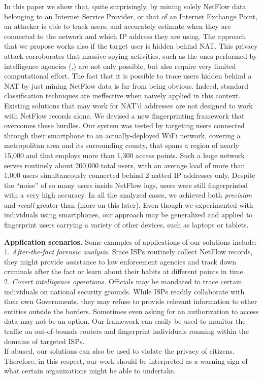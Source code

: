 \documentclass[10pt,conference,compsocconf,letterpaper]{IEEEtran}
\begin{document}
In this paper we show that, quite surprisingly, by mining solely NetFlow data belonging to an Internet Service Provider, or that of an Internet Exchange Point, an attacker is able to track users, and accurately estimate when they are connected to the network and which IP address they are using.  The approach that we propose works also if the target user is hidden behind NAT. This privacy attack corroborates that massive spying activities, such as the ones performed by intelligence agencies (\cite{Brandom2013},\cite{Ehrenfreund2013}) are not only possible, but also require very limited computational effort. 
The fact that it is possible to trace users hidden behind a NAT by just mining NetFlow data is far from being obvious. Indeed, standard classification techniques are ineffective when naively applied in this context. Existing solutions that may work for NAT'd addresses are not designed to work with NetFlow records alone. We devised a new fingerprinting framework that overcomes these hurdles. Our system was tested by targeting users connected through their smartphone to an actually-deployed WiFi network, covering a metropolitan area and its surrounding county, that spans a region of nearly 15,000  and that employs more than 1,300 access points. Such a huge network serves routinely about 200,000 total users, with an average load of more than 1,000 users simultaneously connected behind 2 natted IP addresses only. Despite the ``noise'' of so many users inside NetFlow logs,  users were still fingerprinted with a very high accuracy. In all the analyzed cases, we achieved both {\em precision} and {\em recall} greater than  (more on this later). 
Even though we experimented with individuals using smartphones, our approach may be generalized and applied to 
fingerprint users carrying a variety of other devices, such as laptops or tablets.

{\bf Application scenarios.} Some examples of applications of our solutions include:\\
1. {\em After-the-fact forensic analysis.} Since ISPs routinely collect NetFlow records, they might provide assistance to law enforcement agencies and track down criminals after the fact or learn about their habits at different points in time. 
\\
2. {\em Covert intelligence operations.} Officials may be mandated to trace certain individuals on 
national security grounds. While ISPs readily collaborate with their own Governments, they may refuse to provide relevant information to other entities outside the borders. Sometimes even asking for an authorization to access data may not be an option. Our framework can easily be used to monitor the traffic on out-of-bounds routers and fingerprint individuals roaming within the domains of targeted ISPs. 
\\
If abused, our solutions can also be used to violate the privacy of citizens. Therefore, in this respect, our work should be interpreted as a warning sign of what certain organizations might be able to undertake.   
\end{document}
